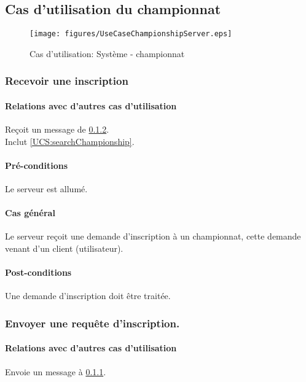 
\subsection{Cas d'utilisation du championnat}

\begin{figure}[h]
  \centering
  \texttt{[image: figures/UseCaseChampionshipServer.eps]}
  \caption{\label{fig:UCS:championshipManagement}Cas d'utilisation: Système - championnat}
\end{figure}

\subsubsection{Recevoir une inscription}
\label{UCS:receiveInscription}
\paragraph{Relations avec d'autres cas d'utilisation}
Reçoit un message de \ref{UCS:sendInscription}.\\
Inclut \ref{UCS:searchChampionship}.
\paragraph{Pré-conditions}
\begin{list}{}{\leftmargin=1.5em}
\item{Le serveur est allumé.}
\end{list}
\paragraph{Cas général}
Le serveur reçoit une demande d'inscription à un championnat, cette demande venant d'un client (utilisateur).
\paragraph{Post-conditions}
\begin{list}{}{\leftmargin=1.5em}
\item{Une demande d'inscription doit être traitée.}
\end{list}

\subsubsection{Envoyer une requête d'inscription.}
\label{UCS:sendInscription}
\paragraph{Relations avec d'autres cas d'utilisation}
Envoie un message à \ref{UCS:receiveInscription}.
